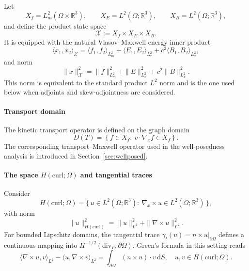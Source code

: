 \documentclass[AMA,Times2COL]{WileyNJDv5}
\begin{document}
Let
\[
X_f = L^2_m(\Omega\times\mathbb{R}^3),\qquad 
X_E = L^2(\Omega;\mathbb{R}^3),\qquad 
X_B = L^2(\Omega;\mathbb{R}^3),
\]
and define the product state space
\[
\mathscr{X} := X_f \times X_E \times X_B.
\]
It is equipped with the natural Vlasov--Maxwell energy inner product
\[
\langle x_1 , x_2 \rangle_{\mathscr{X}}
= 
\langle f_1 , f_2 \rangle_{L^2_m}
+
\langle E_1 , E_2 \rangle_{L^2_x}
+
c^2\langle B_1 , B_2 \rangle_{L^2_x},
\]
and norm
\[
\|x\|_{\mathscr{X}}^2
=
\|f\|_{L^2_m}^2
+
\|E\|_{L^2_x}^2
+
c^2\|B\|_{L^2_x}^2 .
\]
This norm is equivalent to the standard product $L^2$ norm and is the one used below when adjoints and skew-adjointness are considered.


\paragraph*{Transport domain}
The kinetic transport operator is defined on the graph domain
\begin{equation}\label{eq:dom}
D(T)
=
\left\{
f\in X_f:\ v\!\cdot\nabla_x f\in X_f
\right\}.
\end{equation}
The corresponding transport--Maxwell operator used in the well-posedness analysis is introduced in Section~\ref{sec:wellposed}.
\paragraph*{The space $H(\mathrm{curl};\Omega)$ and tangential traces}
Consider
\[
H(\mathrm{curl};\Omega)=
\big\{\,u\in L^2(\Omega;\mathbb{R}^3):\
\nabla_x\times u\in L^2(\Omega;\mathbb{R}^3)\,\big\},
\]
with norm
\[
\|u\|_{H(\mathrm{curl})}^2
=
\|u\|_{L^2}^2+\|\nabla\times u\|_{L^2}^2 .
\]
For bounded Lipschitz domains, the tangential trace
$\gamma_t(u)=n\times u|_{\partial\Omega}$ defines a continuous mapping into
$H^{-1/2}(\mathrm{div}_{\Gamma},\partial\Omega)$.
Green's formula in this setting reads
\begin{equation}\label{eq:greens-curl}
\langle \nabla\times u , v \rangle_{L^2}
-
\langle u , \nabla\times v \rangle_{L^2}
=
\int_{\partial\Omega} (n\times u)\cdot v\, \mathrm{d}S ,
\quad
u,v\in H(\mathrm{curl};\Omega).
\end{equation}
\end{document}
